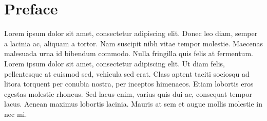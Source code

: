 \chapter{Preface}
Lorem ipsum dolor sit amet, consectetur adipiscing elit. Donec leo diam, semper a lacinia ac, aliquam a tortor. Nam suscipit nibh vitae tempor molestie. Maecenas malesuada urna id bibendum commodo. Nulla fringilla quis felis at fermentum. Lorem ipsum dolor sit amet, consectetur adipiscing elit. Ut diam felis, pellentesque at euismod sed, vehicula sed erat. Class aptent taciti sociosqu ad litora torquent per conubia nostra, per inceptos himenaeos. Etiam lobortis eros egestas molestie rhoncus. Sed lacus enim, varius quis dui ac, consequat tempor lacus. Aenean maximus lobortis lacinia. Mauris at sem et augue mollis molestie in nec mi.
